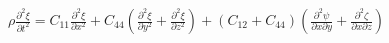 \documentclass[preview]{standalone}
\begin{document}
\begin{center}
$\rho\frac{\partial^2\xi}{\partial t^2} = C_{11}\frac{\partial^2\xi}{\partial x^2}+
                          C_{44}\left( \frac{\partial^2\xi}{\partial y^2}+\frac{\partial^2\xi}{\partial z^2}\right)+
                        (C_{12} + C_{44})\left( \frac{\partial ^2\psi}{\partial x\partial y}+\frac{\partial^2\zeta}{\partial x \partial z}\right)$
\end{center}
\end{document}
